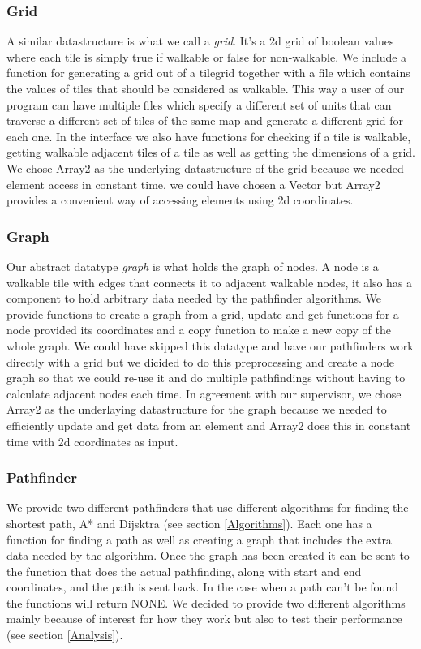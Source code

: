 \documentclass[12pt, a4paper]{article}
\begin{document}
\subsubsection{Grid}

A similar datastructure is what we call a \textit{grid}. It's a 2d grid of boolean values where each tile is simply true if walkable or false for non-walkable. We include a function for generating a grid out of a tilegrid together with a file which contains the values of tiles that should be considered as walkable. This way a user of our program can have multiple files which specify a different set of units that can traverse a different set of tiles of the same map and generate a different grid for each one. In the interface we also have functions for checking if a tile is walkable, getting walkable adjacent tiles of a tile as well as getting the dimensions of a grid. We chose Array2 as the underlying datastructure of the grid because we needed element access in constant time, we could have chosen a Vector but Array2 provides a convenient way of accessing elements using 2d coordinates. 

\subsubsection{Graph}
Our abstract datatype \textit{graph} is what holds the graph of nodes. A node is a walkable tile with edges that connects it to adjacent walkable nodes, it also has a component to hold arbitrary data needed by the pathfinder algorithms. We provide functions to create a graph from a grid, update and get functions for a node provided its coordinates and a copy function to make a new copy of the whole graph. We could have skipped this datatype and have our pathfinders work directly with a grid but we dicided to do this preprocessing and create a node graph so that we could re-use it and do multiple pathfindings without having to calculate adjacent nodes each time. In agreement with our supervisor, we chose Array2 as the underlaying datastructure for the graph because we needed to efficiently update and get data from an element and Array2 does this in constant time with 2d coordinates as input.

\subsubsection{Pathfinder}
We provide two different pathfinders that use different algorithms for finding the shortest path, A* and Dijsktra (see section \ref{Algorithms}). Each one has a function for finding a path as well as creating a graph that includes the extra data needed by the algorithm. Once the graph has been created it can be sent to the function that does the actual pathfinding, along with start and end coordinates, and the path is sent back. In the case when a path can't be found the functions will return NONE. We decided to provide two different algorithms mainly because of interest for how they work but also to test their performance (see section \ref{Analysis}).
\end{document}
